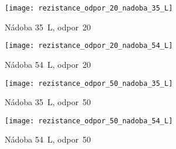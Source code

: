 \begin{figure}[ht]
	\label{img:pic_rezistance_odpor_20_nadoba_35_L}
	\begin{center}
		\texttt{[image: rezistance\_odpor\_20\_nadoba\_35\_L]}
		\caption{Nádoba \SI{35}{L}, odpor~20}
	\end{center}
\end{figure}

\begin{figure}[ht]
	\label{img:pic_rezistance_odpor_20_nadoba_54_L}
	\begin{center}
		\texttt{[image: rezistance\_odpor\_20\_nadoba\_54\_L]}
		\caption{Nádoba \SI{54}{L}, odpor~20}
	\end{center}
\end{figure}

\begin{figure}[ht]
	\label{img:pic_rezistance_odpor_50_nadoba_35_L}
	\begin{center}
		\texttt{[image: rezistance\_odpor\_50\_nadoba\_35\_L]}
		\caption{Nádoba \SI{35}{L}, odpor~50}
	\end{center}
\end{figure}

\begin{figure}[ht]
	\label{img:pic_rezistance_odpor_50_nadoba_54_L}
	\begin{center}
		\texttt{[image: rezistance\_odpor\_50\_nadoba\_54\_L]}
		\caption{Nádoba \SI{54}{L}, odpor~50}
	\end{center}
\end{figure}
